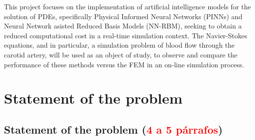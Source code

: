 \documentclass[12pt,letterpaper]{article}
\begin{document}

This project focuses on the implementation of artificial intelligence models for the solution of 
PDEs, specifically Physical Informed Neural Networks (PINNs) and Neural Network asisted Reduced 
Basis Models (NN-RBM), seeking to obtain a reduced computational cost in a real-time simulation 
context. The Navier-Stokes equations, and in particular, a simulation problem of blood flow through 
the carotid artery, will be used as an object of study, to observe and compare the performance of 
these methods versus the FEM in an on-line simulation process. 

\section{Statement of the problem}



\subsection{Statement of the problem (\textcolor{red}{4 a 5 párrafos})}

\end{document}
